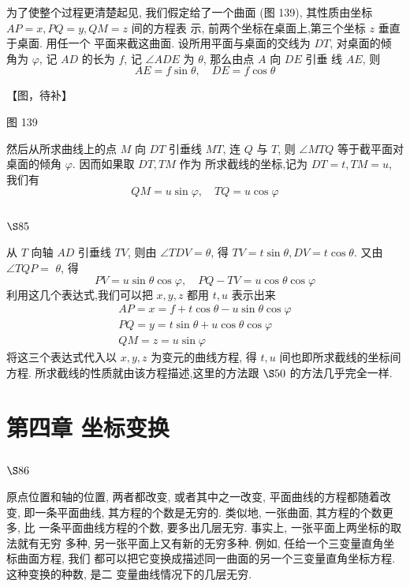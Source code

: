 为了使整个过程更清楚起见, 我们假定给了一个曲面 (图 139), 其性质由坐标 $A P=x, P Q=y, Q M=z$ 间的方程表 示, 前两个坐标在桌面上,第三个坐标 $z$ 垂直于桌面. 用任一个 平面来截这曲面. 设所用平面与桌面的交线为 $D T$, 对桌面的倾 角为 $\varphi$, 记 $A D$ 的长为 $f$, 记 $\angle A D E$ 为 $\theta$, 那么由点 $A$ 向 $D E$ 引垂 线 $A E$, 则
\[
A E=f \sin \theta, \quad D E=f \cos \theta
\]


【图，待补】

图 139 

然后从所求曲线上的点 $M$ 向 $D T$ 引垂线 $M T$, 连 $Q$ 与 $T$, 则
$\angle M T Q$ 等于截平面对桌面的倾角 $\varphi$. 因而如果取 $D T, T M$ 作为 所求截线的坐标,记为 $D T=t, T M=u$, 我们有
\[
Q M=u \sin \varphi, \quad T Q=u \cos \varphi
\]
\section{$\S 85$}

从 $T$ 向轴 $A D$ 引垂线 $T V$, 则由 $\angle T D V=\theta$, 得 $T V=t \sin \theta, D V=t \cos \theta$. 又由 $\angle T Q P=$ $\theta$, 得
\[
P V=u \sin \theta \cos \varphi, \quad P Q-T V=u \cos \theta \cos \varphi
\]
利用这几个表达式,我们可以把 $x, y, z$ 都用 $t, u$ 表示出来
\[
\begin{gathered}
A P=x=f+t \cos \theta-u \sin \theta \cos \varphi \\
P Q=y=t \sin \theta+u \cos \theta \cos \varphi \\
Q M=z=u \sin \varphi
\end{gathered}
\]
将这三个表达式代入以 $x, y, z$ 为变元的曲线方程, 得 $t, u$ 间也即所求截线的坐标间方程. 所求截线的性质就由该方程描述,这里的方法跟 $\S 50$ 的方法几乎完全一样. 

\chapter{第四章 坐标变换}

\section{$\S 86$}

原点位置和轴的位置, 两者都改变, 或者其中之一改变, 平面曲线的方程都随着改 变, 即一条平面曲线, 其方程的个数是无穷的. 类似地, 一张曲面, 其方程的个数更多, 比 一条平面曲线方程的个数, 要多出几层无穷. 事实上, 一张平面上两坐标的取法就有无穷 多种, 另一张平面上又有新的无穷多种. 例如, 任给一个三变量直角坐标曲面方程, 我们 都可以把它变换成描述同一曲面的另一个三变量直角坐标方程. 这种变换的种数, 是二 变量曲线情况下的几层无穷.

